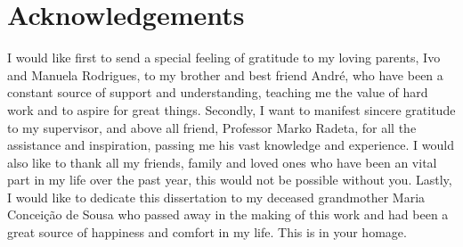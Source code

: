 \chapter*{Acknowledgements}

I would like first to send a special feeling of gratitude to my loving parents, Ivo and Manuela Rodrigues, to my brother and best friend André, who have been a constant source of support and understanding, teaching me the value of hard work and to aspire for great things.
Secondly, I want to manifest sincere gratitude to my supervisor, and above all friend, Professor Marko Radeta, for all the assistance and inspiration, passing me his vast knowledge and experience.
I would also like to thank all my friends, family and loved ones who have been an vital part in my life over the past year, this would not be possible without you.
Lastly, I would like to dedicate this dissertation to my deceased grandmother Maria Conceição de Sousa who passed away in the making of this work and had been a great source of happiness and comfort in my life. This is in your homage.

